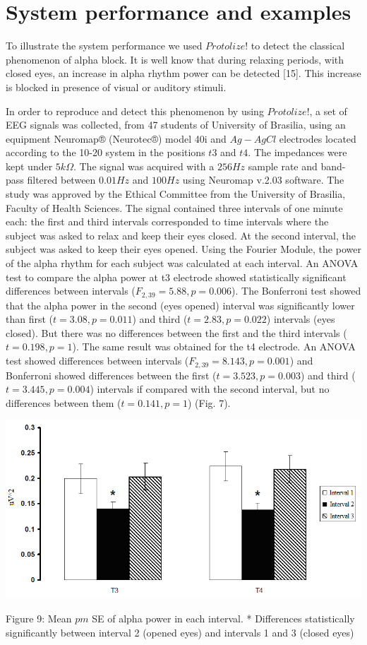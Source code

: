 \documentclass[12pt, a4paper]{article}
\begin{document}
\section{System performance and examples}

To illustrate the system performance we used $Protolize!$ to detect the classical phenomenon of alpha block.  It is well know that during relaxing periods, with closed eyes, an increase in alpha rhythm power can be detected [15]. This increase is blocked in presence of visual or auditory stimuli. 

In order to reproduce and detect this phenomenon by using $Protolize!$, a set of EEG signals was collected, from 47 students of University of Brasilia, using an equipment Neuromap® (Neurotec®) model 40i and $Ag-AgCl$ electrodes located according to the 10-20 system in the positions $t3$ and $t4$. The impedances were kept under $5k\Omega$. The signal was acquired with a $256 Hz$ sample rate and band-pass filtered between $0.01 Hz$ and $100 Hz$ using Neuromap v.2.03 software. The study was approved by the Ethical Committee from the University of Brasilia, Faculty of Health Sciences. The signal contained three intervals of one minute each: the first and third intervals corresponded to time intervals where the subject was asked to relax and keep their eyes closed. At the second interval, the subject was asked to keep their eyes opened. Using the Fourier Module, the power of the alpha rhythm for each subject was calculated at each interval.  An ANOVA test to compare the alpha power at t3 electrode showed statistically significant differences between intervals ($F_{2,39}=5.88, p=0.006$). The Bonferroni test showed that the alpha power in the second (eyes opened) interval was significantly lower than first ($t=3.08, p=0.011$) and third ($t=2.83, p=0.022$) intervals (eyes closed). But there was no differences between the first and the third intervals ($t=0.198, p=1$). The same result was obtained for the t4 electrode. An ANOVA test showed differences between intervals ($F_{2,39}=8.143, p=0.001$) and Bonferroni showed differences between the first  ($t=3.523, p=0.003$) and third ($t=3.445, p=0.004$) intervals if compared with the second interval, but no differences between them ($t=0.141, p=1$) (Fig. 7).
\begin{center}
\includegraphics{image009.png}

Figure 9: Mean $pm$ SE of alpha power in each interval. * Differences statistically significantly between interval 2 (opened eyes) and intervals 1 and 3 (closed eyes)
\end{center}
\end{document}

